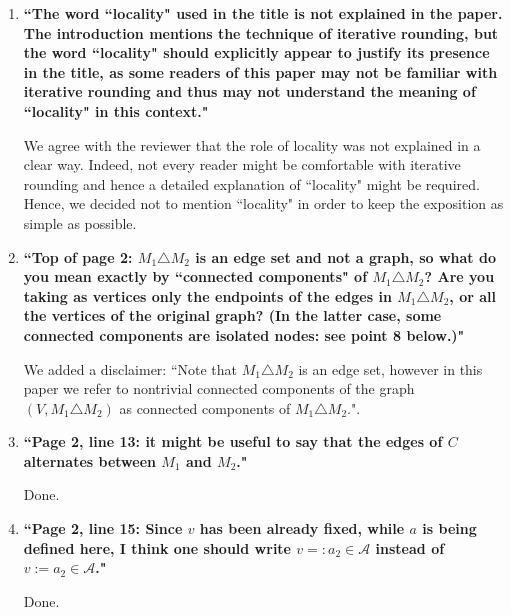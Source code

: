 \documentclass[11pt]{article}
\begin{document}
\begin{enumerate}
	\item \textbf{``The word ``locality" used in the title is not explained in the paper. The introduction mentions the technique of iterative rounding, but the word ``locality" should explicitly appear to justify its presence in the title, as some readers of this paper may not be familiar with iterative rounding and thus may not understand the meaning of ``locality" in this context."}
	
	\smallskip
	
	We agree with the reviewer that the role of locality was not explained in a clear way. Indeed, not every reader might be comfortable with iterative rounding and hence a detailed explanation of ``locality" might be required. Hence, we decided not to mention ``locality" in order to keep the exposition as simple as possible.
	
	\bigskip
	
	\item  \textbf{``Top of page 2: $M_1\triangle M_2$ is an edge set and not a graph, so what do you mean exactly by ``connected components" of $M_1\triangle M_2$? Are you taking as vertices only the endpoints
of the edges in $M_1\triangle M_2$, or all the vertices of the original graph? (In the latter case,
some connected components are isolated nodes: see point 8 below.)"}
	
	\smallskip
	
	We added a disclaimer: ``Note that $M_1\triangle M_2$ is an edge set, however in this paper we refer to nontrivial connected components of the graph $(V, M_1\triangle M_2)$ as connected components of $M_1\triangle M_2$.".
	
	\bigskip

	\item  \textbf{``Page 2, line 13: it might be useful to say that the edges of $C$ alternates between $M_1$
and $M_2$."}
	
	\smallskip
	
	Done.
	
	\bigskip
	
	\item \textbf{``Page 2, line 15: Since $v$ has been already fixed, while $a$ is being defined here, I think
one should write $v =: a_2 \in \mathcal{A}$ instead of $v := a_2\in \mathcal{A}$."}
	
		
	\smallskip
	
	Done.
	
	\bigskip
	

\end{enumerate}
\end{document}
